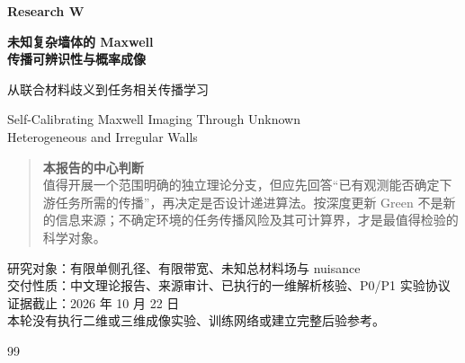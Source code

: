 \documentclass[11pt,a4paper]{article}
\theoremstyle{definition}
\theoremstyle{remark}
\begin{document}
\begin{titlepage}
\vspace*{18mm}
{\LARGE\bfseries Research W\par}
\vspace{8mm}
{\huge\bfseries 未知复杂墙体的 Maxwell\\[3mm]传播可辨识性与概率成像\par}
\vspace{7mm}
{\Large 从联合材料歧义到任务相关传播学习\par}
\vspace{10mm}
{\large Self-Calibrating Maxwell Imaging Through Unknown\\Heterogeneous and Irregular Walls\par}
\vspace{15mm}
\begin{quote}
\textbf{本报告的中心判断}\\[3pt]
值得开展一个范围明确的独立理论分支，但应先回答“已有观测能否确定下游任务所需的传播”，再决定是否设计递进算法。按深度更新 Green 不是新的信息来源；不确定环境的任务传播风险及其可计算界，才是最值得检验的科学对象。
\end{quote}
\vfill
研究对象：有限单侧孔径、有限带宽、未知总材料场与 nuisance\\
交付性质：中文理论报告、来源审计、已执行的一维解析核验、P0/P1 实验协议\\
证据截止：2026 年 10 月 22 日\\
本轮没有执行二维或三维成像实验、训练网络或建立完整后验参考。
\end{titlepage}
\tableofcontents
\clearpage

\clearpage

\clearpage

\clearpage

\clearpage

\clearpage

\clearpage

\clearpage

\clearpage

\clearpage

\clearpage
\appendix

\clearpage
\begin{thebibliography}{99}


\end{thebibliography}
\end{document}
